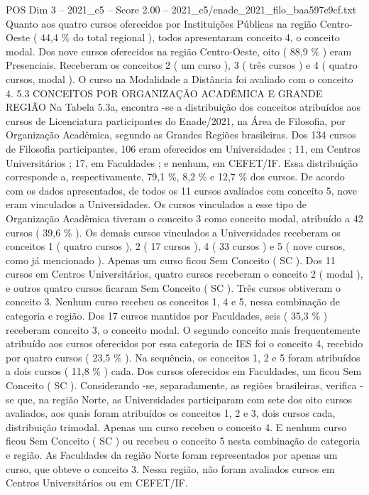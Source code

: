 \begin{textsample}{POS Dim 3 – 2021\_c5 – Score 2.00 – 2021\_c5/enade\_2021\_filo\_baa597e9cf.txt}
Quanto aos quatro cursos oferecidos por Instituições Públicas na região Centro-Oeste ( 44,4 \% do total regional ), todos apresentaram conceito 4, o conceito modal.
Dos nove cursos oferecidos na região Centro-Oeste, oito ( 88,9 \% ) eram Presenciais.
Receberam os conceitos 2 ( um curso ), 3 ( três cursos ) e 4 ( quatro cursos, modal ).
O curso na Modalidade a Distância foi avaliado com o conceito 4. 5.3 CONCEITOS POR ORGANIZAÇÃO ACADÊMICA E GRANDE REGIÃO Na Tabela 5.3a, encontra -se a distribuição dos conceitos atribuídos aos cursos de Licenciatura participantes do Enade/2021, na Área de Filosofia, por Organização Acadêmica, segundo as Grandes Regiões brasileiras.
Dos 134 cursos de Filosofia participantes, 106 eram oferecidos em Universidades ; 11, em Centros Universitários ; 17, em Faculdades ; e nenhum, em CEFET/IF.
Essa distribuição corresponde a, respectivamente, 79,1 \%, 8,2 \% e 12,7 \% dos cursos.
De acordo com os dados apresentados, de todos os 11 cursos avaliados com conceito 5, nove eram vinculados a Universidades.
Os cursos vinculados a esse tipo de Organização Acadêmica tiveram o conceito 3 como conceito modal, atribuído a 42 cursos ( 39,6 \% ).
Os demais cursos vinculados a Universidades receberam os conceitos 1 ( quatro cursos ), 2 ( 17 cursos ), 4 ( 33 cursos ) e 5 ( nove cursos, como já mencionado ).
Apenas um curso ficou Sem Conceito ( SC ).
Dos 11 cursos em Centros Universitários, quatro cursos receberam o conceito 2 ( modal ), e outros quatro cursos ficaram Sem Conceito ( SC ).
Três cursos obtiveram o conceito 3.
Nenhum curso recebeu os conceitos 1, 4 e 5, nessa combinação de categoria e região.
Dos 17 cursos mantidos por Faculdades, seis ( 35,3 \% ) receberam conceito 3, o conceito modal.
O segundo conceito mais frequentemente atribuído aos cursos oferecidos por essa categoria de IES foi o conceito 4, recebido por quatro cursos ( 23,5 \% ).
Na sequência, os conceitos 1, 2 e 5 foram atribuídos a dois cursos ( 11,8 \% ) cada.
Dos cursos oferecidos em Faculdades, um ficou Sem Conceito ( SC ).
Considerando -se, separadamente, as regiões brasileiras, verifica -se que, na região Norte, as Universidades participaram com sete dos oito cursos avaliados, aos quais foram atribuídos os conceitos 1, 2 e 3, dois cursos cada, distribuição trimodal.
Apenas um curso recebeu o conceito 4.
E nenhum curso ficou Sem Conceito ( SC ) ou recebeu o conceito 5 nesta combinação de categoria e região.
As Faculdades da região Norte foram representados por apenas um curso, que obteve o conceito 3.
Nessa região, não foram avaliados cursos em Centros Universitários ou em CEFET/IF.

\end{textsample}
